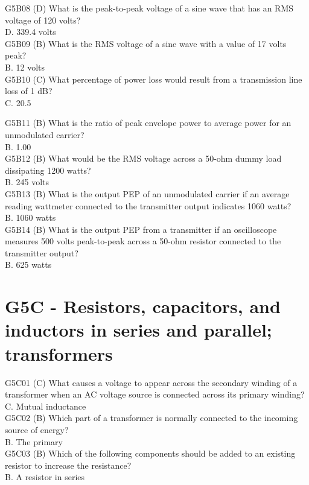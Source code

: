 \documentclass[12pt,letterpaper]{report}
\begin{document}
G5B08 (D) What is the peak-to-peak voltage of a sine wave that has an RMS voltage of 120 volts?\\ 
D. 339.4 volts \\

G5B09 (B) What is the RMS voltage of a sine wave with a value of 17 volts peak? \\
B. 12 volts \\

G5B10 (C) What percentage of power loss would result from a transmission line loss of 1 dB?\\
C. 20.5%

G5B11 (B) What is the ratio of peak envelope power to average power for an unmodulated carrier?\\
B. 1.00\\

G5B12 (B) What would be the RMS voltage across a 50-ohm dummy load dissipating 1200 watts?\\
B. 245 volts\\

G5B13 (B) What is the output PEP of an unmodulated carrier if an average reading wattmeter connected to the transmitter output indicates 1060 watts?\\
B. 1060 watts\\

G5B14 (B) What is the output PEP from a transmitter if an oscilloscope measures 500 volts peak-to-peak across a 50-ohm resistor connected to the transmitter output?\\
B. 625 watts\\

\section{G5C - Resistors, capacitors, and inductors in series and parallel; transformers}

G5C01 (C) What causes a voltage to appear across the secondary winding of a transformer when an AC voltage source is connected across its primary winding?\\
C. Mutual inductance\\

G5C02 (B) Which part of a transformer is normally connected to the incoming source of energy? \\
B. The primary \\

G5C03 (B) Which of the following components should be added to an existing resistor to increase the resistance?\\
B. A resistor in series\\
\end{document}
